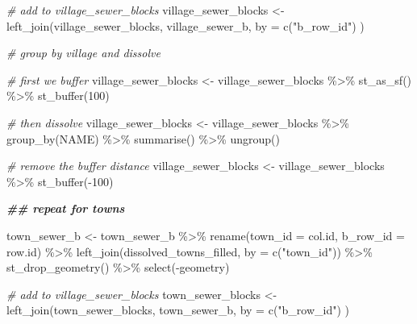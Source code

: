 \documentclass[
]{book}
\newenvironment{Shaded}{\begin{snugshade}}{\end{snugshade}}
\newcommand{\AttributeTok}[1]{\textcolor[rgb]{0.77,0.63,0.00}{#1}}
\newcommand{\CommentTok}[1]{\textcolor[rgb]{0.56,0.35,0.01}{\textit{#1}}}
\newcommand{\DecValTok}[1]{\textcolor[rgb]{0.00,0.00,0.81}{#1}}
\newcommand{\DocumentationTok}[1]{\textcolor[rgb]{0.56,0.35,0.01}{\textbf{\textit{#1}}}}
\newcommand{\FunctionTok}[1]{\textcolor[rgb]{0.00,0.00,0.00}{#1}}
\newcommand{\NormalTok}[1]{#1}
\newcommand{\OtherTok}[1]{\textcolor[rgb]{0.56,0.35,0.01}{#1}}
\newcommand{\SpecialCharTok}[1]{\textcolor[rgb]{0.00,0.00,0.00}{#1}}
\newcommand{\StringTok}[1]{\textcolor[rgb]{0.31,0.60,0.02}{#1}}
\begin{document}
\begin{Shaded}
\begin{Highlighting}[]
\CommentTok{\# add to village\_sewer\_blocks}
\NormalTok{village\_sewer\_blocks }\OtherTok{\textless{}{-}} \FunctionTok{left\_join}\NormalTok{(village\_sewer\_blocks, village\_sewer\_b, }
                                  \AttributeTok{by =} \FunctionTok{c}\NormalTok{(}\StringTok{"b\_row\_id"}\NormalTok{)}
\NormalTok{                                  )}

\CommentTok{\# group by village and dissolve}

\CommentTok{\# first we buffer}
\NormalTok{village\_sewer\_blocks }\OtherTok{\textless{}{-}}\NormalTok{ village\_sewer\_blocks }\SpecialCharTok{\%\textgreater{}\%}
  \FunctionTok{st\_as\_sf}\NormalTok{() }\SpecialCharTok{\%\textgreater{}\%}
  \FunctionTok{st\_buffer}\NormalTok{(}\DecValTok{100}\NormalTok{)}

\CommentTok{\# then dissolve}
\NormalTok{village\_sewer\_blocks }\OtherTok{\textless{}{-}}\NormalTok{ village\_sewer\_blocks }\SpecialCharTok{\%\textgreater{}\%} 
  \FunctionTok{group\_by}\NormalTok{(NAME) }\SpecialCharTok{\%\textgreater{}\%}
  \FunctionTok{summarise}\NormalTok{() }\SpecialCharTok{\%\textgreater{}\%}
  \FunctionTok{ungroup}\NormalTok{()}

\CommentTok{\# remove the buffer distance}
\NormalTok{village\_sewer\_blocks }\OtherTok{\textless{}{-}}\NormalTok{ village\_sewer\_blocks }\SpecialCharTok{\%\textgreater{}\%}
  \FunctionTok{st\_buffer}\NormalTok{(}\SpecialCharTok{{-}}\DecValTok{100}\NormalTok{)}

\DocumentationTok{\#\# repeat for towns}

\NormalTok{town\_sewer\_b }\OtherTok{\textless{}{-}}\NormalTok{ town\_sewer\_b }\SpecialCharTok{\%\textgreater{}\%}
  \FunctionTok{rename}\NormalTok{(}\AttributeTok{town\_id =}\NormalTok{ col.id,}
         \AttributeTok{b\_row\_id =}\NormalTok{ row.id) }\SpecialCharTok{\%\textgreater{}\%}
  \FunctionTok{left\_join}\NormalTok{(dissolved\_towns\_filled, }\AttributeTok{by =} \FunctionTok{c}\NormalTok{(}\StringTok{"town\_id"}\NormalTok{)) }\SpecialCharTok{\%\textgreater{}\%}
  \FunctionTok{st\_drop\_geometry}\NormalTok{() }\SpecialCharTok{\%\textgreater{}\%}
  \FunctionTok{select}\NormalTok{(}\SpecialCharTok{{-}}\NormalTok{geometry)}

\CommentTok{\# add to village\_sewer\_blocks}
\NormalTok{town\_sewer\_blocks }\OtherTok{\textless{}{-}} \FunctionTok{left\_join}\NormalTok{(town\_sewer\_blocks, town\_sewer\_b, }
                               \AttributeTok{by =} \FunctionTok{c}\NormalTok{(}\StringTok{"b\_row\_id"}\NormalTok{)}
\NormalTok{                               )}


\end{Highlighting}
\end{Shaded}
\end{document}
